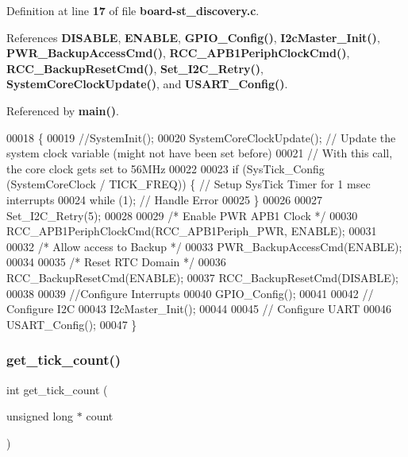 Definition at line \textbf{ 17} of file \textbf{ board-\/st\+\_\+discovery.\+c}.



References \textbf{ D\+I\+S\+A\+B\+LE}, \textbf{ E\+N\+A\+B\+LE}, \textbf{ G\+P\+I\+O\+\_\+\+Config()}, \textbf{ I2c\+Master\+\_\+\+Init()}, \textbf{ P\+W\+R\+\_\+\+Backup\+Access\+Cmd()}, \textbf{ R\+C\+C\+\_\+\+A\+P\+B1\+Periph\+Clock\+Cmd()}, \textbf{ R\+C\+C\+\_\+\+Backup\+Reset\+Cmd()}, \textbf{ Set\+\_\+\+I2\+C\+\_\+\+Retry()}, \textbf{ System\+Core\+Clock\+Update()}, and \textbf{ U\+S\+A\+R\+T\+\_\+\+Config()}.



Referenced by \textbf{ main()}.


\begin{DoxyCode}
00018 \{
00019     \textcolor{comment}{//SystemInit();}
00020     SystemCoreClockUpdate();                               \textcolor{comment}{// Update the system clock variable (might not
       have been set before)}
00021                                                            \textcolor{comment}{// With this call, the core clock gets set to
       56MHz}
00022     
00023     \textcolor{keywordflow}{if} (SysTick\_Config (SystemCoreClock / TICK_FREQ)) \{     \textcolor{comment}{// Setup SysTick Timer for 1 msec interrupts}
00024         \textcolor{keywordflow}{while} (1);                                          \textcolor{comment}{// Handle Error}
00025     \}   
00026     
00027     Set_I2C_Retry(5);
00028   
00029     \textcolor{comment}{/* Enable PWR APB1 Clock */}
00030     RCC_APB1PeriphClockCmd(RCC_APB1Periph_PWR, ENABLE);
00031 
00032     \textcolor{comment}{/* Allow access to Backup */}
00033     PWR_BackupAccessCmd(ENABLE);
00034 
00035     \textcolor{comment}{/* Reset RTC Domain */}
00036     RCC_BackupResetCmd(ENABLE);
00037     RCC_BackupResetCmd(DISABLE);
00038  
00039     \textcolor{comment}{//Configure Interrupts}
00040     GPIO_Config();  
00041 
00042     \textcolor{comment}{// Configure I2C}
00043     I2cMaster_Init(); 
00044 
00045     \textcolor{comment}{// Configure UART}
00046     USART_Config(); 
00047 \}
\end{DoxyCode}
\mbox{\label{board-st__discovery_8c_ae640b1a6fa58dce2fd3858ed0df803c0}} 
\subsubsection{get\+\_\+tick\+\_\+count()}
{\footnotesize\ttfamily int get\+\_\+tick\+\_\+count (\begin{DoxyParamCaption}\item[{unsigned long $\ast$}]{count }\end{DoxyParamCaption})}



